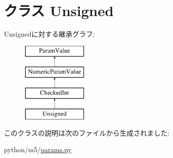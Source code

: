 \hypertarget{classm5_1_1params_1_1Unsigned}{
\section{クラス Unsigned}
\label{classm5_1_1params_1_1Unsigned}
}
Unsignedに対する継承グラフ:\begin{figure}[H]
\begin{center}
\leavevmode
\includegraphics[height=4cm]{classm5_1_1params_1_1Unsigned}
\end{center}
\end{figure}


このクラスの説明は次のファイルから生成されました:\begin{DoxyCompactItemize}
\item 
python/m5/\hyperlink{params_8py}{params.py}\end{DoxyCompactItemize}
